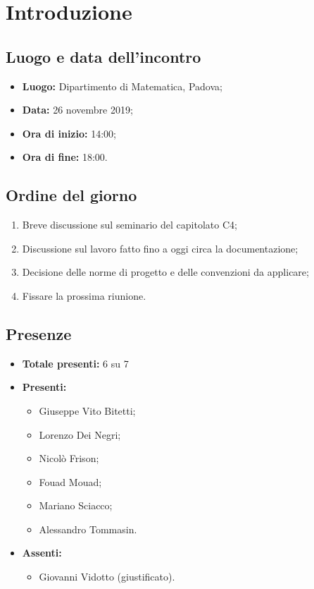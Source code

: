 \section*{Introduzione}

\subsection*{Luogo e data dell'incontro}
	\begin{itemize}
		\item \textbf{Luogo:} Dipartimento di Matematica, Padova;
		\item \textbf{Data:} 26 novembre 2019;
		\item \textbf{Ora di inizio:} 14:00;
		\item \textbf{Ora di fine:} 18:00.
	\end{itemize}

\subsection*{Ordine del giorno}
	\begin{enumerate}
		\item Breve discussione sul seminario del capitolato C4;
		\item Discussione sul lavoro fatto fino a oggi circa la documentazione;
		\item Decisione delle norme di progetto e delle convenzioni da applicare;
		\item Fissare la prossima riunione.
	\end{enumerate}

\subsection*{Presenze}
	\begin{itemize}
		\item \textbf{Totale presenti:} 6 su 7
		\item \textbf{Presenti: }
			\begin{itemize}			
				\item Giuseppe Vito Bitetti;
				\item Lorenzo Dei Negri;
				\item Nicolò Frison;
				\item Fouad Mouad;
				\item Mariano Sciacco;
				\item Alessandro Tommasin.
			\end{itemize}
		\item \textbf{Assenti: } 
			\begin{itemize}	
				\item Giovanni Vidotto (giustificato).
			\end{itemize}
	\end{itemize}


